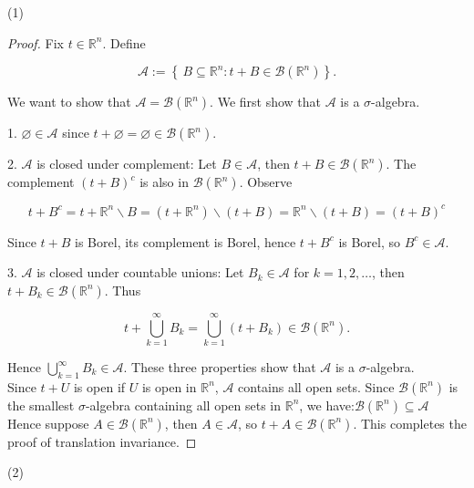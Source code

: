 \documentclass{qlnotes-export}
\begin{document}
(1)

\begin{proof}

Fix \(t \in {\mathbb{R}}^{n}\). Define

\[\mathcal{A} := \left\{ {\, B \subseteq {\mathbb{R}}^{n}:t + B \in \mathcal{B}({\mathbb{R}}^{n})} \right\}.\]

We want to show that \(\mathcal{A} = \mathcal{B}({\mathbb{R}}^{n})\). We first show that \(\mathcal{A}\) is a \(\sigma\)-algebra.

1. \(\varnothing \in \mathcal{A}\) since \(t + \varnothing = \varnothing \in \mathcal{B}({\mathbb{R}}^{n})\).

2. \(\mathcal{A}\) is closed under complement: Let \(B \in \mathcal{A}\), then \(t + B \in \mathcal{B}({\mathbb{R}}^{n})\). The complement \((t + B)^{c}\) is also in \(\mathcal{B}({\mathbb{R}}^{n})\). Observe

\[t + B^{c} = t + {\mathbb{R}}^{n}\backslash B = (t + {\mathbb{R}}^{n})\backslash(t + B) = {\mathbb{R}}^{n}\backslash(t + B) = (t + B)^{c}\]

Since \(t + B\) is Borel, its complement is Borel, hence \(t + B^{c}\) is Borel, so \(B^{c} \in \mathcal{A}\).

3. \(\mathcal{A}\) is closed under countable unions: Let \(B_{k} \in \mathcal{A}\) for \(k = 1,2,\ldots\), then \(t + B_{k} \in \mathcal{B}({\mathbb{R}}^{n})\). Thus

\[t + \bigcup\limits_{k = 1}^{\infty}B_{k} = \bigcup\limits_{k = 1}^{\infty}(t + B_{k}) \in \mathcal{B}({\mathbb{R}}^{n}).\]

Hence \(\bigcup_{k = 1}^{\infty}B_{k} \in \mathcal{A}\). These three properties show that \(\mathcal{A}\) is a \(\sigma\)-algebra.\\
Since \(t + U\) is open if \(U\) is open in \({\mathbb{R}}^{n}\), \(\mathcal{A}\) contains all open sets. Since \(\mathcal{B}({\mathbb{R}}^{n})\) is the smallest \(\sigma\)-algebra containing all open sets in \({\mathbb{R}}^{n}\), we have:\(\mathcal{B}({\mathbb{R}}^{n}) \subseteq \mathcal{A}\) Hence suppose \(A \in \mathcal{B}({\mathbb{R}}^{n})\), then \(A \in \mathcal{A}\), so \(t + A \in \mathcal{B}({\mathbb{R}}^{n})\). This completes the proof of translation invariance.

\end{proof}

(2)
\end{document}
